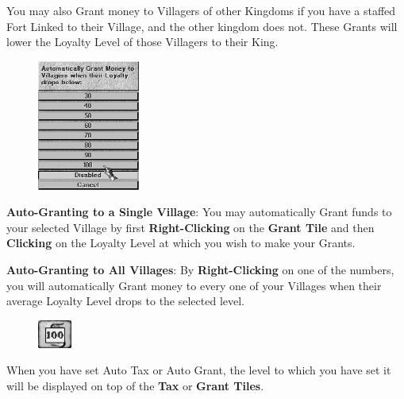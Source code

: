 You may also Grant money to Villagers of other Kingdoms if you have a staffed Fort Linked to their Village, and the other kingdom does not. These Grants will lower the Loyalty Level of those Villagers to their King.


\begin{figure}
    \vspace{-20pt}
    \begin{center}
        \includegraphics[width=0.3\textwidth]{Iautogrant} %
    \end{center}
    \vspace{-20pt}
\end{figure}

\textbf{Auto-Granting to a Single Village}: You may automatically Grant funds to your selected Village by first \textbf{Right-Clicking} on the \textbf{Grant Tile} and then \textbf{Clicking} on the Loyalty Level at which you wish to make your Grants.

\textbf{Auto-Granting to All Villages}: By \textbf{Right-Clicking} on one of the numbers, you will automatically Grant money to every one of your Villages when their average Loyalty Level drops to the selected level.

\begin{figure}
    \vspace{-20pt}
    \begin{center}
        \includegraphics[width=0.1\textwidth]{Tautotax100}
    \end{center}
    \vspace{-20pt}
\end{figure}

When you have set Auto Tax or Auto Grant, the level to which you have set it will be displayed on top of the \textbf{Tax} or \textbf{Grant Tiles}. \\

